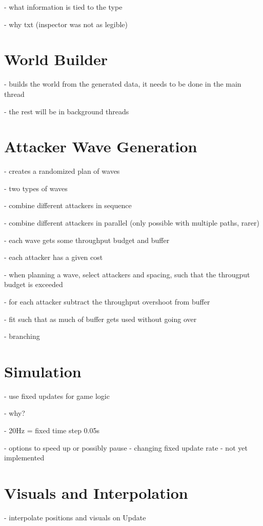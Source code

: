 - what information is tied to the type

- why txt (inspector was not as legible)

\section{World Builder}

- builds the world from the generated data, it needs to be done in the main thread

- the rest will be in background threads

\section{Attacker Wave Generation}

- creates a randomized plan of waves

- two types of waves

- combine different attackers in sequence

- combine different attackers in parallel (only possible with multiple paths, rarer)

- each wave gets some throughput budget and buffer

- each attacker has a given cost

- when planning a wave, select attackers and spacing, such that the througput budget is exceeded

- for each attacker subtract the throughput overshoot from buffer

- fit such that as much of buffer gets used without going over

- branching

\section{Simulation}

- use fixed updates for game logic

- why?

- 20Hz = fixed time step 0.05s

- options to speed up or possibly pause - changing fixed update rate - not yet implemented

\section{Visuals and Interpolation}

- interpolate positions and visuals on Update

